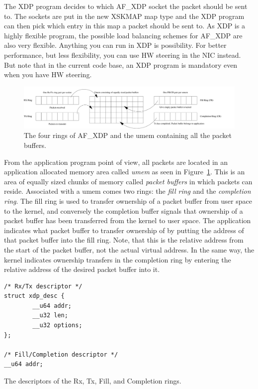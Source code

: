 \documentclass[9pt,numbers,reprint]{sigplanconf}
\begin{document}
The XDP program decides to which AF\_XDP socket the packet should be
sent to. The sockets are put in the new XSKMAP map type and the XDP
program can then pick which entry in this map a packet should be sent
to. As XDP is a highly flexible program, the possible load balancing
schemes for AF\_XDP are also very flexible. Anything you can run in
XDP is possibility. For better performance, but less flexibility, you
can use HW steering in the NIC instead. But note that in the current
code base, an XDP program is mandatory even when you have HW steering.

\begin{figure}[ht]
\includegraphics[width=\textwidth]{queues_and_umem.pdf}
  \caption{The four rings of AF\_XDP and the umem containing all the
    packet buffers.}
  \label{fig:queues_and_umem}
\end{figure}

From the application program point of view, all packets are located in
an application allocated memory area called \emph{umem} as seen in
Figure~\ref{fig:queues_and_umem}. This is an area of equally sized
chunks of memory called \emph{packet buffers} in which packets can
reside. Associated with a umem comes two rings: the \emph{fill ring}
and the \emph{completion ring}. The fill ring is used to transfer
ownership of a packet buffer from user space to the kernel, and
conversely the completion buffer signals that ownership of a packet
buffer has been transferred from the kernel to user space. The
application indicates what packet buffer to transfer ownership of by
putting the address of that packet buffer into the fill ring. Note,
that this is the relative address from the start of the packet buffer,
not the actual virtual address. In the same way, the kernel indicates
ownership transfers in the completion ring by entering the relative
address of the desired packet buffer into it.

\begin{listing}[p]
\begin{verbatim}
/* Rx/Tx descriptor */
struct xdp_desc {
        __u64 addr;
        __u32 len;
        __u32 options;
};

/* Fill/Completion descriptor */
__u64 addr;
\end{verbatim}
\caption{The descriptors of the Rx, Tx, Fill, and Completion rings.}
\label{lst:desc_structs}
\end{listing}
\end{document}
